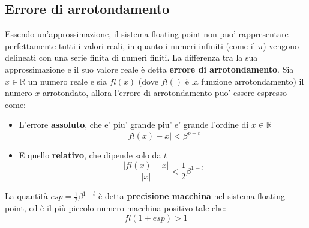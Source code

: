 \subsection{Errore di arrotondamento}
Essendo un'approssimazione, il sistema floating point non puo' rappresentare perfettamente tutti i valori reali, in quanto i numeri infiniti (come il $\pi$) vengono delineati con una serie finita di numeri finiti. La differenza tra la sua approssimazione e il suo valore reale è detta \textbf{errore di arrotondamento}. Sia $x\in \mathbb{R}$ un numero reale e sia $fl(x)$ (dove $fl()$ è la funzione arrotondamento) il numero $x$ arrotondato, allora l'errore di arrotondamento puo' essere espresso come:
\begin{itemize}
\item L'errore \textbf{assoluto}, che e' piu' grande piu' e' grande l'ordine di $ x \in \mathbb{R}$
  \[
    |fl(x)-x|<\beta^{p-t}
  \]
\item E quello \textbf{relativo}, che dipende solo da $ t $
  \[
    \frac{|fl(x)-x|}{|x|} < \frac{1}{2}\beta^{1-t}
  \]
\end{itemize}
 La quantità $esp=\frac{1}{2}\beta^{1-t}$ è detta  \textbf{precisione macchina} nel sistema floating point, ed è il più piccolo numero macchina positivo tale che: 
 \[
    fl(1+esp)>1
 \]
